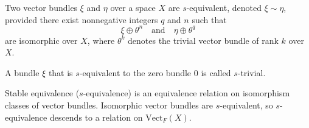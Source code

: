 Two vector bundles $\xi$ and $\eta$ over a space $X$ are $s$-equivalent, denoted $\xi \sim \eta$, provided there exist nonnegative integers $q$ and $n$ such that
$$
\xi \oplus \theta^n \quad \text{and} \quad \eta \oplus \theta^q
$$
are isomorphic over $X$, where $\theta^k$ denotes the trivial vector bundle of rank $k$ over $X$.

A bundle $\xi$ that is $s$-equivalent to the zero bundle $0$ is called $s$-trivial.

Stable equivalence ($s$-equivalence) is an equivalence relation on isomorphism classes of vector bundles. Isomorphic vector bundles are $s$-equivalent, so $s$-equivalence descends to a relation on $\text{Vect}_F(X)$.
